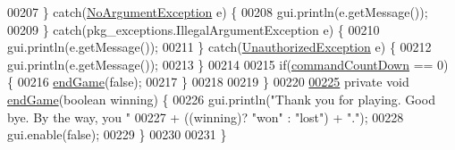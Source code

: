 \begin{DoxyCode}
00207         \} \textcolor{keywordflow}{catch}(\hyperlink{classpkg__exceptions_1_1NoArgumentException}{NoArgumentException} e) \{
00208             gui.println(e.getMessage());
00209         \} \textcolor{keywordflow}{catch}(pkg\_exceptions.IllegalArgumentException e) \{
00210             gui.println(e.getMessage());
00211         \} \textcolor{keywordflow}{catch}(\hyperlink{classpkg__exceptions_1_1UnauthorizedException}{UnauthorizedException} e) \{
00212             gui.println(e.getMessage());
00213         \}
00214 
00215         \textcolor{keywordflow}{if}(\hyperlink{classGameEngine_ad4ff8d760eced9c7b76cdeb0dc989975}{commandCountDown} == 0) \{
00216             \hyperlink{classGameEngine_a1f5fa36c5dfc36c9a963fe439afc057b}{endGame}(\textcolor{keyword}{false});
00217         \}
00218 
00219     \}
00220 
\hypertarget{GameEngine_8java_source_l00225}{}\hyperlink{classGameEngine_a1f5fa36c5dfc36c9a963fe439afc057b}{00225}     \textcolor{keyword}{private} \textcolor{keywordtype}{void} \hyperlink{classGameEngine_a1f5fa36c5dfc36c9a963fe439afc057b}{endGame}(\textcolor{keywordtype}{boolean} winning) \{
00226         gui.println(\textcolor{stringliteral}{"Thank you for playing. Good bye. By the way, you "}
00227                 + ((winning)? \textcolor{stringliteral}{"won"} : \textcolor{stringliteral}{"lost"}) + \textcolor{stringliteral}{"."});
00228         gui.enable(\textcolor{keyword}{false});
00229     \}
00230 
00231 \}
\end{DoxyCode}
